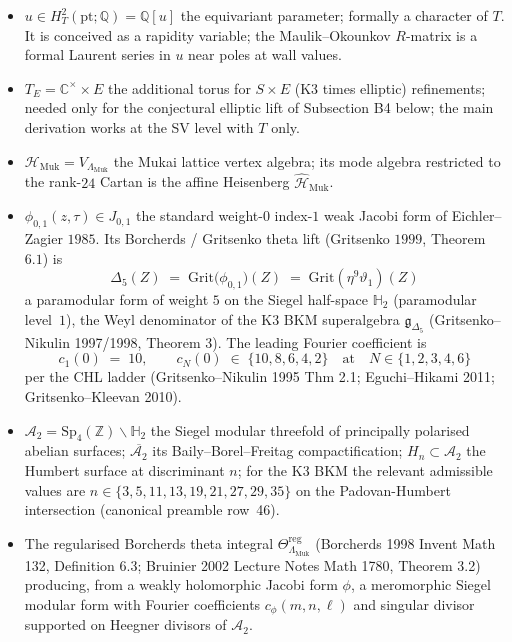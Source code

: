 \begin{itemize}
      $T$-equivariant chart and then descends by \v Cech--Ran gluing
      on the Mukai lattice, per Agent 14's local-to-global argument.
\item $u \in H^{2}_{T}(\mathrm{pt}; \mathbb Q) = \mathbb Q[u]$ the
      equivariant parameter; formally a character of $T$.  It is
      conceived as a rapidity variable; the Maulik--Okounkov
      $R$-matrix is a formal Laurent series in $u$ near poles at
      wall values.
\item $T_E = \mathbb C^{\times} \times E$ the additional torus for
      $S \times E$ (K3 times elliptic) refinements; needed only for
      the conjectural elliptic lift of Subsection B4 below; the main
      derivation works at the SV level with $T$ only.
\item $\mathcal H_{\mathrm{Muk}} = V_{\Lambda_{\mathrm{Muk}}}$ the
      Mukai lattice vertex algebra; its mode algebra restricted to
      the rank-$24$ Cartan is the affine Heisenberg
      $\widehat{\mathcal H}_{\mathrm{Muk}}$.
\item $\phi_{0, 1}(z, \tau) \in J_{0, 1}$ the standard weight-$0$
      index-$1$ weak Jacobi form of Eichler--Zagier $1985$.  Its
      Borcherds / Gritsenko theta lift (Gritsenko $1999$,
      Theorem $6.1$) is
      \[
         \Delta_5(Z)
           \;=\;
           \mathrm{Grit}\bigl(\phi_{0,1}\bigr)(Z)
           \;=\;
           \mathrm{Grit}(\eta^{9}\vartheta_{1})(Z)
      \]
      a paramodular form of weight $5$ on the Siegel half-space
      $\mathbb H_{2}$ (paramodular level~$1$), the Weyl denominator
      of the K3 BKM superalgebra $\mathfrak g_{\Delta_5}$
      (Gritsenko--Nikulin 1997/1998, Theorem 3).  The leading
      Fourier coefficient is
      \[
         c_1(0) \;=\; 10,
         \qquad
         c_N(0) \;\in\; \{10, 8, 6, 4, 2\}
         \quad \text{at}\quad N \in \{1, 2, 3, 4, 6\}
      \]
      per the CHL ladder (Gritsenko--Nikulin 1995 Thm 2.1;
      Eguchi--Hikami 2011; Gritsenko--Kleevan 2010).
\item $\mathcal A_2 = \mathrm{Sp}_{4}(\mathbb Z) \backslash \mathbb H_2$
      the Siegel modular threefold of principally polarised abelian
      surfaces; $\overline{\mathcal A_2}$ its Baily--Borel--Freitag
      compactification; $H_{n} \subset \mathcal A_2$ the Humbert
      surface at discriminant $n$; for the K3 BKM the relevant
      admissible values are $n \in \{3, 5, 11, 13, 19, 21, 27, 29, 35\}$
      on the Padovan-Humbert intersection (canonical preamble
      row~46).
\item The regularised Borcherds theta integral
      $\Theta^{\mathrm{reg}}_{\Lambda_{\mathrm{Muk}}}$ (Borcherds
      1998 Invent Math 132, Definition 6.3; Bruinier 2002 Lecture
      Notes Math 1780, Theorem 3.2) producing, from a weakly
      holomorphic Jacobi form $\phi$, a meromorphic Siegel modular
      form with Fourier coefficients $c_{\phi}(m, n, \ell)$ and
      singular divisor supported on Heegner divisors of
      $\mathcal A_2$.
\end{itemize}

